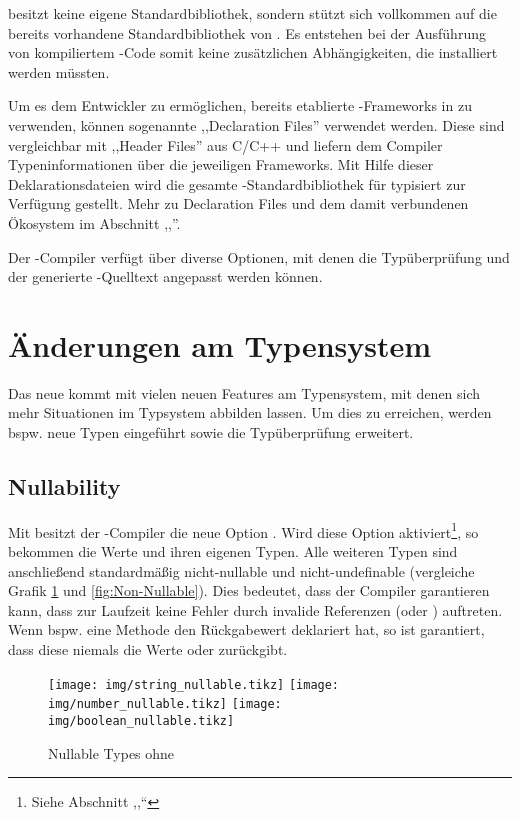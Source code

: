 \ts besitzt keine eigene Standardbibliothek, sondern stützt sich vollkommen auf die bereits vorhandene Standardbibliothek von \js. Es entstehen bei der Ausführung von kompiliertem \ts-Code somit keine zusätzlichen Abhängigkeiten, die installiert werden müssten.

Um es dem Entwickler zu ermöglichen, bereits etablierte \js-Frameworks in \ts zu verwenden, können sogenannte ,,Declaration Files'' verwendet werden. Diese sind vergleichbar mit ,,Header Files'' aus C/C++ und liefern dem Compiler Typeninformationen über die jeweiligen Frameworks. Mit Hilfe dieser Deklarationsdateien wird die gesamte \js-Standardbibliothek für \ts typisiert zur Verfügung gestellt. Mehr zu Declaration Files und dem damit verbundenen Ökosystem im Abschnitt ,,''.

Der \ts-Compiler verfügt über diverse Optionen, mit denen die Typüberprüfung und der generierte \js-Quelltext angepasst werden können.

\section{Änderungen am Typensystem}
Das neue \ts kommt mit vielen neuen Features am Typensystem, mit denen sich mehr Situationen im Typsystem abbilden lassen. Um dies zu erreichen, werden bspw. neue Typen eingeführt sowie die Typüberprüfung erweitert.

\subsection{Nullability}
\label{nullability}
Mit  besitzt der \ts-Compiler die neue Option . Wird diese Option aktiviert\footnote{Siehe Abschnitt ,,``}, so bekommen die Werte \tsnull und \tsundefined ihren eigenen Typen. Alle weiteren Typen sind anschließend standardmäßig nicht-nullable und nicht-undefinable (vergleiche Grafik \ref{fig:Nullable} und \ref{fig:Non-Nullable}). Dies bedeutet, dass der Compiler garantieren kann, dass zur Laufzeit keine Fehler durch invalide Referenzen (\tsnull oder \tsundefined) auftreten. Wenn bspw. eine Methode den Rückgabewert \tsstring deklariert hat, so ist garantiert, dass diese niemals die Werte \tsnull oder \tsundefined zurückgibt.

\begin{figure}[htb]
	\centering
	\texttt{[image: img/string\_nullable.tikz]}
	\texttt{[image: img/number\_nullable.tikz]}
	\texttt{[image: img/boolean\_nullable.tikz]}
	\caption{Nullable Types ohne }
	\label{fig:Nullable}
\end{figure}

